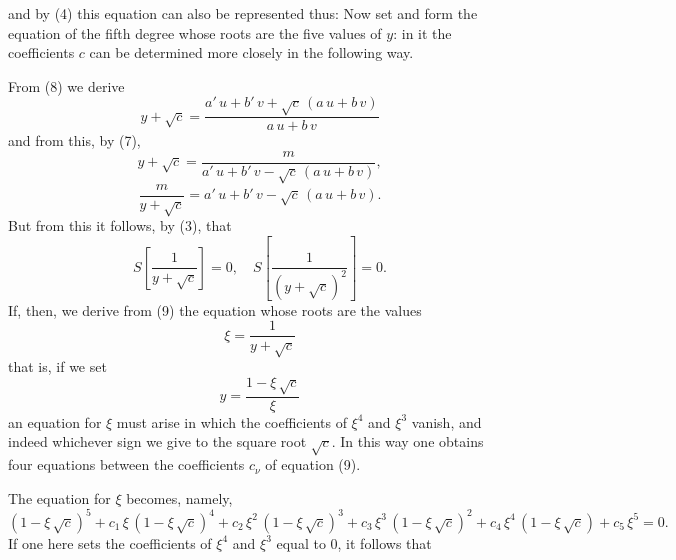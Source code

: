 and by (4) this equation can also be represented thus:
Now set
and form the equation of the fifth degree whose roots are the five values of $y$:
in it the coefficients $c$ can be determined more closely in the following way.

From (8) we derive
\[
y + \sqrt{c} = \frac{a'\,u + b'\,v + \sqrt{c}\,(a\,u + b\,v)}{a\,u + b\,v}
\]
and from this, by (7),
\[
y + \sqrt{c} = \frac{m}{a'\,u + b'\,v - \sqrt{c}\,(a\,u + b\,v)},
\]
\[
\frac{m}{y + \sqrt{c}} = a'\,u + b'\,v - \sqrt{c}\,(a\,u + b\,v).
\]
But from this it follows, by (3), that
\[
S\left[\frac{1}{y + \sqrt{c}}\right] = 0, \quad S\left[\frac{1}{(y + \sqrt{c})^2}\right] = 0.
\]
If, then, we derive from (9) the equation whose roots are the values
\[
\xi = \frac{1}{y + \sqrt{c}}
\]
that is, if we set
\[
y = \frac{1 - \xi\,\sqrt{c}}{\xi}
\]
an equation for $\xi$ must arise in which the coefficients of $\xi^4$ and $\xi^3$ vanish, and indeed whichever sign we give to the square root $\sqrt{c}$. In this way one obtains four equations between the coefficients $c_\nu$ of equation (9).

The equation for $\xi$ becomes, namely,
\[
(1 - \xi\,\sqrt{c})^5 + c_1\,\xi\,(1 - \xi\,\sqrt{c})^4 + c_2\,\xi^2\,(1 - \xi\,\sqrt{c})^3 + c_3\,\xi^3\,(1 - \xi\,\sqrt{c})^2 + c_4\,\xi^4\,(1 - \xi\,\sqrt{c}) + c_5\,\xi^5 = 0.
\]
If one here sets the coefficients of $\xi^4$ and $\xi^3$ equal to 0, it follows that
